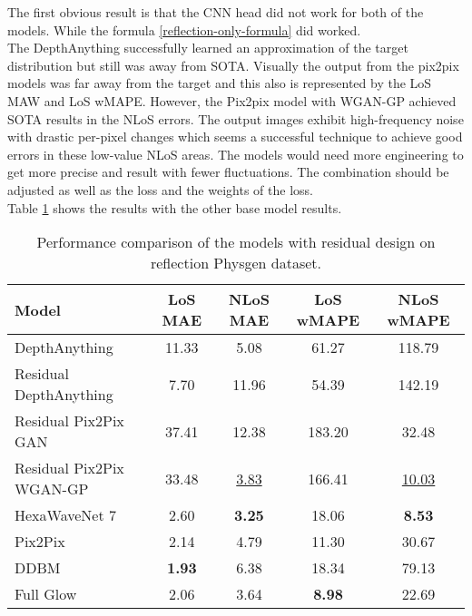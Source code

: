 		
		The first obvious result is that the CNN head did not work for both of the models. While the formula \ref{reflection-only-formula} did worked.\\
		The DepthAnything successfully learned an approximation of the target distribution but still was away from SOTA. Visually the output from the pix2pix models was far away from the target and this also is represented by the LoS MAW and LoS wMAPE. However, the Pix2pix model with WGAN-GP achieved SOTA results in the NLoS errors. The output images exhibit high-frequency noise with drastic per-pixel changes which seems a successful technique to achieve good errors in these low-value NLoS areas. The models would need more engineering to get more precise and result with fewer fluctuations. The combination should be adjusted as well as the loss and the weights of the loss.\\
		Table \ref{tab:experiment_residual_design_results} shows the results with the other base model results.
		\begin{table}[h!]
			\centering
			\begin{tabular}{|l|c|c|c|c|}
				\hline
				\textbf{Model} & \textbf{LoS MAE} & \textbf{NLoS MAE} & \textbf{LoS wMAPE} & \textbf{NLoS wMAPE} \\
				\hline
				DepthAnything & 11.33 & 5.08 & 61.27 & 118.79 \\
				Residual DepthAnything & 7.70 & 11.96 & 54.39 & 142.19 \\
				Residual Pix2Pix GAN & 37.41 & 12.38 & 183.20 & 32.48 \\
				Residual Pix2Pix WGAN-GP & 33.48 & \underline{3.83} & 166.41 & \underline{10.03} \\
				HexaWaveNet 7 & 2.60 & \textbf{3.25} & 18.06 & \textbf{8.53} \\
				Pix2Pix & 2.14 & 4.79 & 11.30 & 30.67 \\
				DDBM & \textbf{1.93} & 6.38 & 18.34 & 79.13 \\
				Full Glow & 2.06 & 3.64 & \textbf{8.98} & 22.69 \\
				\hline
			\end{tabular}
			\caption{Performance comparison of the models with residual design on reflection Physgen dataset.}
			\label{tab:experiment_residual_design_results}
		\end{table}
		\FloatBarrier
		
	\clearpage
	

